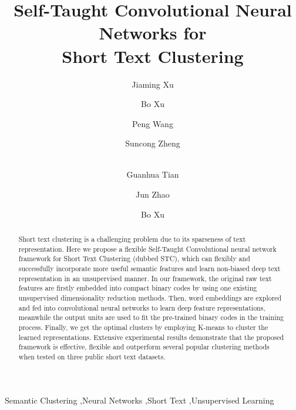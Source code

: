 \documentclass[review]{elsarticle}
\begin{document}
\begin{frontmatter}

\title{Self-Taught Convolutional Neural Networks for\\Short Text Clustering}



\author[mymainaddress]{Jiaming Xu}
\author[mymainaddress]{Bo Xu}
\author[mymainaddress]{Peng Wang}
\author[mymainaddress]{Suncong Zheng}
\author[mymainaddress]{\\Guanhua Tian}
\author[mymainaddress,mysecondaryaddress]{Jun Zhao}

\author[mymainaddress,brainaddress]{Bo Xu}

\address[mymainaddress]{Institute of Automation, Chinese Academy of Sciences (CAS), Beijing, P.R. China}
\address[mysecondaryaddress]{National Laboratory of Pattern Recognition (NLPR), Beijing, P.R. China}
\address[brainaddress]{Center for Excellence in Brain Science and Intelligence Technology, CAS. P.R. China}


\begin{abstract}
  Short text clustering is a challenging problem due to its sparseness of text representation. Here we propose a flexible Self-Taught Convolutional neural network framework for Short Text Clustering (dubbed STC), which can flexibly and successfully incorporate more useful semantic features and learn non-biased deep text representation in an unsupervised manner. In our framework, the original raw text features are firstly embedded into compact binary codes by using one existing unsupervised dimensionality reduction methods. Then, word embeddings are explored and fed into convolutional neural networks to learn deep feature representations, meanwhile the output units are used to fit the pre-trained binary codes in the training process. Finally, we get the optimal clusters by employing K-means to cluster the learned representations. Extensive experimental results demonstrate that the proposed framework is effective, flexible and outperform several popular clustering methods when tested on three public short text datasets.
\end{abstract}

\begin{keyword}
Semantic Clustering \sep Neural Networks \sep Short Text \sep Unsupervised Learning
\end{keyword}

\end{frontmatter}
\end{document}

